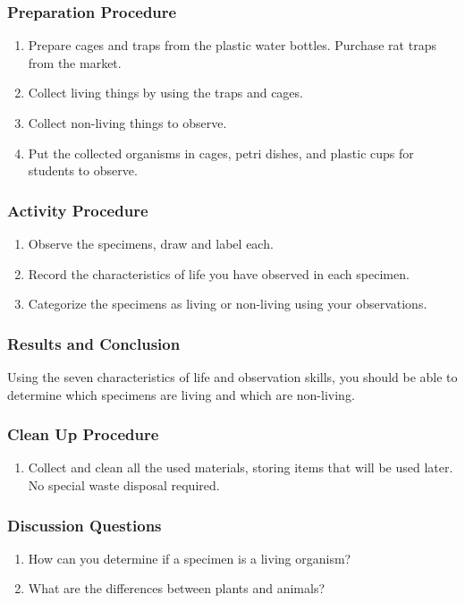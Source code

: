 \subsubsection*{Preparation Procedure}
\begin{enumerate}
\item{Prepare cages and traps from the plastic water bottles. Purchase rat traps from the market.}
\item{Collect living things by using the traps and cages.}
\item{Collect non-living things to observe.}
\item{Put the collected organisms in cages, petri dishes, and plastic cups for students to observe.}
\end{enumerate}

\subsubsection*{Activity Procedure}
\begin{enumerate}
\item{Observe the specimens, draw and label each.}
\item{Record the characteristics of life you have observed in each specimen.}
\item{Categorize the specimens as living or non-living using your observations.}
\end{enumerate}

\subsubsection*{Results and Conclusion}
Using the seven characteristics of life and observation skills, you should be able to determine which specimens are living and which are non-living. 

\subsubsection*{Clean Up Procedure}
\begin{enumerate}
\item{Collect and clean all the used materials, storing items that will be used later. No special waste disposal required.}
\end{enumerate}

\subsubsection*{Discussion Questions}
\begin{enumerate}
\item{How can you determine if a specimen is a living organism?}
\item{What are the differences between plants and animals?}
\end{enumerate}


